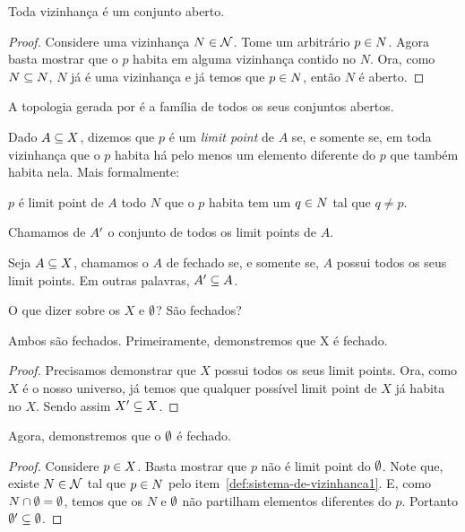 \begin{fact}
	Toda vizinhança é um conjunto aberto.
\end{fact}

\begin{proof}
	Considere uma vizinhança $N \in \mathcal{N}$. Tome um arbitrário $p \in N$. Agora basta mostrar que o $p$ habita em alguma vizinhança contido no $N$. Ora, como $N \subseteq N$, $N$ já é uma vizinhança e já temos que $p \in N$, então $N$ é aberto.
\end{proof}

\begin{definition}
	A topologia gerada por  é a família  de todos os seus conjuntos abertos.
\end{definition}

\begin{definition}
	Dado $A \subseteq X$, dizemos que $p$ é um \textit{limit point} de $A$ se, e somente se, em toda vizinhança que o $p$ habita há pelo menos um elemento diferente do $p$ que também habita nela. Mais formalmente:
	\begin{center}
		$p$ é limit point de $A$ \sse todo $N$ que o $p$ habita tem um $q \in N$ tal que $q \neq p$. 
	\end{center}
\end{definition}

\begin{definition}
	Chamamos de $A^\prime$ o conjunto de todos os limit points de $A$.
\end{definition}

\begin{definition}
	Seja $A \subseteq X$, chamamos o $A$ de fechado se, e somente se, $A$ possui todos os seus limit points. Em outras palavras, $A^\prime \subseteq A$.
\end{definition}

\begin{question}
	\label{universo-fechado}
	\label{vazio-fechado}
	O que dizer sobre os $X$ e $\emptyset$? São fechados?
\end{question}

\begin{answer}
	Ambos são fechados. Primeiramente, demonstremos que X é fechado.
	\begin{proof}
		Precisamos demonstrar que $X$ possui todos os seus limit points. Ora, como $X$ é o nosso universo, já temos que qualquer possível limit point de $X$ já habita no $X$. Sendo assim $X^\prime \subseteq X$.
	\end{proof}

	Agora, demonstremos que o $\emptyset$ é fechado.
	\begin{proof}
		Considere $p \in X$. Basta mostrar que $p$ não é limit point do $\emptyset$. Note que, existe $N \in \mathcal{N}$ tal que $p \in N$ pelo item~\ref{def:sistema-de-vizinhanca1}. E, como $N \cap \emptyset = \emptyset$, temos que os $N$ e $\emptyset$ não partilham elementos diferentes do $p$. Portanto $\emptyset^\prime \subseteq \emptyset$.
	\end{proof}
\end{answer}

